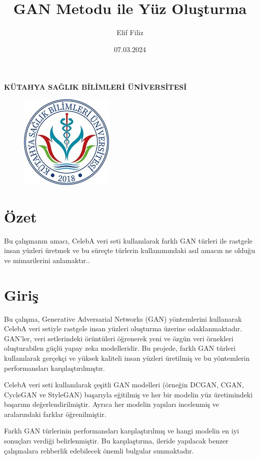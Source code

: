 \documentclass[12pt, a4paper]{article}
\title{\textbf{GAN Metodu ile Yüz Oluşturma}}
\author{Elif Filiz}
\date{07.03.2024}
\begin{document}
	\thispagestyle{empty}
	\maketitle 
	
	\textbf{KÜTAHYA SAĞLIK BİLİMLERİ ÜNİVERSİTESİ}\centering
	\begin{figure}[!h]
		\centering
		\includegraphics{ksbu}
	\end{figure}
	\newpage
	\tableofcontents
	\newpage
	
	\raggedright
	\section{Özet}

	Bu çalışmanın amacı, CelebA veri seti kullanılarak farklı GAN türleri ile rastgele insan yüzleri üretmek ve bu süreçte türlerin kullanımındaki asıl amacın ne olduğu ve mimarilerini anlamaktır..
	
	\section{Giriş}
	
	Bu çalışma, Generative Adversarial Networks (GAN) yöntemlerini kullanarak CelebA veri setiyle rastgele insan yüzleri oluşturma üzerine odaklanmaktadır. GAN'ler, veri setlerindeki örüntüleri öğrenerek yeni ve özgün veri örnekleri oluşturabilen güçlü yapay zeka modelleridir. Bu projede, farklı GAN türleri kullanılarak gerçekçi ve yüksek kaliteli insan yüzleri üretilmiş ve bu yöntemlerin performansları karşılaştırılmıştır.
	
	CelebA veri seti kullanılarak çeşitli GAN modelleri (örneğin DCGAN, CGAN, CycleGAN ve StyleGAN) başarıyla eğitilmiş ve her bir modelin yüz üretimindeki başarımı değerlendirilmiştir. Ayrıca her modelin yapıları incelenmiş ve aralarındaki farklar öğrenilmiştir.
	
	Farklı GAN türlerinin performansları karşılaştırılmış ve hangi modelin en iyi sonuçları verdiği belirlenmiştir. Bu karşılaştırma, ileride yapılacak benzer çalışmalara rehberlik edebilecek önemli bulgular sunmaktadır.
	
\end{document}
